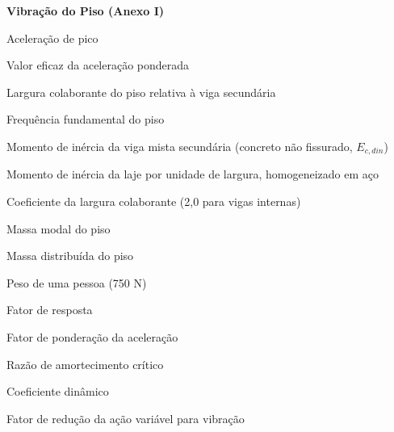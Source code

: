 \begin{simbolos}
  \item[] \textbf{Vibração do Piso (Anexo I)}
  \item[$a_p$] Aceleração de pico
  \item[$a_{w,rms}$] Valor eficaz da aceleração ponderada
  \item[$B_b$] Largura colaborante do piso relativa à viga secundária
  \item[$f_0$] Frequência fundamental do piso
  \item[$I_b$] Momento de inércia da viga mista secundária (concreto não fissurado, $E_{c,din}$)
  \item[$I_s$] Momento de inércia da laje por unidade de largura, homogeneizado em aço
  \item[$k_b$] Coeficiente da largura colaborante (2,0 para vigas internas)
  \item[$M$] Massa modal do piso
  \item[$m$] Massa distribuída do piso
  \item[$P_0$] Peso de uma pessoa (750 N)
  \item[$R$] Fator de resposta
  \item[$W$] Fator de ponderação da aceleração
  \item[$\beta$] Razão de amortecimento crítico
  \item[$\zeta$] Coeficiente dinâmico
  \item[$\psi_{vib}$] Fator de redução da ação variável para vibração
\end{simbolos}
